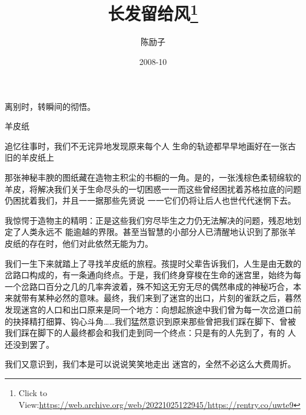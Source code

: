 \documentclass{article}
\title{长发留给风\footnote{Click to View:\url{https://web.archive.org/web/20221025122945/https://rentry.co/uwte9}}}
\author{陈励子}
\date{2008-10}
\begin{document}

\maketitle


\Large


﻿离别时，转瞬间的彻悟。 


羊皮纸 

追忆往事时，我们不无诧异地发现原来每个人
生命的轨迹都早早地画好在一张古旧的羊皮纸上 

那张神秘丰腴的图纸藏在造物主积尘的书橱的一角。是的，一张浅棕色柔韧绵软的羊皮，将解决我们关于生命尽头的一切困惑一一而这些曾经困扰着苏格拉底的问题仍困扰着我们，并且一一据那些先贤说
一一它们仍将让后人也世代代迷惘下去。 

我惊愕于造物主的精明：正是这些我们穷尽毕生之力仍无法解决的问题，残忍地划定了人类永远不
\newpage
能逾越的界限。甚至当智慧的小部分人已清醒地认识到了那张羊皮纸的存在时，他们对此依然无能为力。
 

我们一生下来就踏上了寻找羊皮纸的旅程。孩提时父辈告诉我们，人生是由无数的岔路口构成的，有一条通向终点。于是，我们终身穿梭在生命的迷宫里，始终为每一个岔路口百分之几的几率奔波着，殊不知这无穷无尽的偶然串成的神秘巧合，本来就带有某种必然的意味。最终，我们来到了迷宫的出口，片刻的雀跃之后，暮然发现迷宫的人口和出口原来是同一个地方：向想起旅途中我们曾为每一次岔道口前的抉择精打细算、钩心斗角……我们猛然意识到原来那些曾把我们踩在脚下、曾被我们踩在脚下的人最终都会和我们走到同一个终点：只是有的人先到了，有的
人还没到罢了。 

我们又意识到，我们本是可以说说笑笑地走出
迷宫的，全然不必这么大费周折。 
\end{document}
